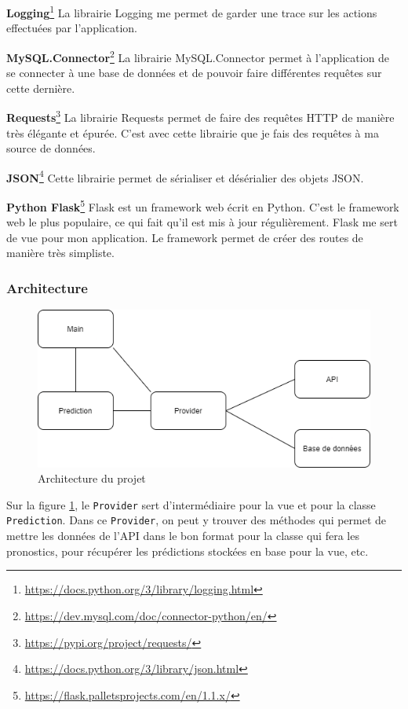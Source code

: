 \documentclass[a4paper,14pt]{extarticle}
\begin{document}
{\noindent\textbf{Logging}\footnote{\url{https://docs.python.org/3/library/logging.html}}
La librairie Logging me permet de garder une trace sur les actions effectuées par l'application. 

\noindent\textbf{MySQL.Connector}\footnote{\url{https://dev.mysql.com/doc/connector-python/en/}}
La librairie MySQL.Connector permet à l'application de se connecter à une base de données et de pouvoir faire différentes requêtes sur cette dernière. 

\noindent\textbf{Requests}\footnote{\url{https://pypi.org/project/requests/}}
La librairie Requests permet de faire des requêtes HTTP de manière très élégante et épurée. C'est avec cette librairie que je fais des requêtes à ma source de données. 

\noindent\textbf{JSON}\footnote{\url{https://docs.python.org/3/library/json.html}}
Cette librairie permet de sérialiser et désérialier des objets JSON. 

\noindent\textbf{Python Flask}\footnote{\url{https://flask.palletsprojects.com/en/1.1.x/}}
Flask est un framework web écrit en Python. C'est le framework web le plus populaire, ce qui fait qu'il est mis à jour régulièrement. Flask me sert de vue pour mon application. Le framework permet de créer des routes de manière très simpliste.

\subsubsection{Architecture}
\begin{figure}[htp]
    \centering
    \includegraphics[width=15cm]{../img/architectureClasse.png}
    \caption{Architecture du projet}
    \label{fig:architectureClasse}
\end{figure}

Sur la figure \ref{fig:architectureClasse}, le \texttt{Provider} sert d'intermédiaire pour la vue et pour la classe \texttt{Prediction}. Dans ce \texttt{Provider}, on peut y trouver des méthodes qui permet de mettre les données de l'API dans le bon format pour la classe qui fera les pronostics, pour récupérer les prédictions stockées en base pour la vue, etc.

}
\end{document}
